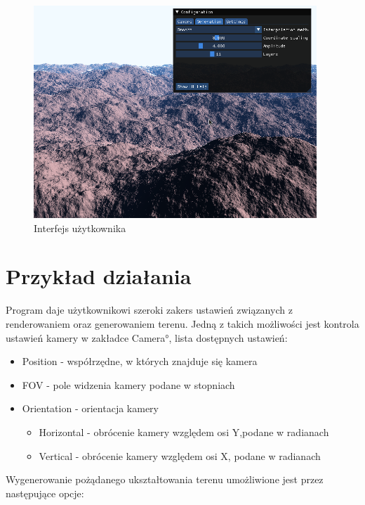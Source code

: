 \begin{figure}
\centering
\includegraphics[width=0.95\textwidth]{./graf/ui.png}
\caption{Interfejs użytkownika}
\label{fig:ui}
\end{figure}

\section{Przykład działania}
Program daje użytkownikowi szeroki zakers ustawień związanych z renderowaniem oraz generowaniem terenu. Jedną z takich możliwości jest kontrola ustawień kamery w zakładce \ang{Camera}, lista dostępnych ustawień:

\begin{itemize}
\item Position - współrzędne, w których znajduje się kamera
\item FOV - pole widzenia kamery podane w stopniach
\item Orientation - orientacja kamery
  \begin{itemize}
    \item Horizontal - obrócenie kamery względem osi Y,podane w radianach
    \item Vertical - obrócenie kamery względem osi X, podane w radianach
  \end{itemize}
\end{itemize}

Wygenerowanie pożądanego ukształtowania terenu umożliwione jest przez następujące opcje:

